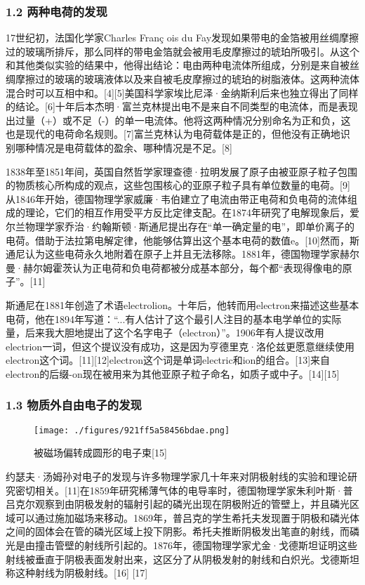 \subsubsection{1.2 两种电荷的发现}
17世纪初，法国化学家Charles Franç ois du Fay发现如果带电的金箔被用丝绸摩擦过的玻璃所排斥，那么同样的带电金箔就会被用毛皮摩擦过的琥珀所吸引。从这个和其他类似实验的结果中，他得出结论：电由两种电流体所组成，分别是来自被丝绸摩擦过的玻璃的玻璃液体以及来自被毛皮摩擦过的琥珀的树脂液体。这两种流体混合时可以互相中和。[4][5]美国科学家埃比尼泽·金纳斯利后来也独立得出了同样的结论。[6]十年后本杰明·富兰克林提出电不是来自不同类型的电流体，而是表现出过量（+）或不足（-）的单一电流体。他将这两种情况分别命名为正和负，这也是现代的电荷命名规则。[7]富兰克林认为电荷载体是正的，但他没有正确地识别哪种情况是电荷载体的盈余、哪种情况是不足。[8]

1838年至1851年间，英国自然哲学家理查德·拉明发展了原子由被亚原子粒子包围的物质核心所构成的观点，这些包围核心的亚原子粒子具有单位数量的电荷。[9]从1846年开始，德国物理学家威廉·韦伯建立了电流由带正电荷和负电荷的流体组成的理论，它们的相互作用受平方反比定律支配。在1874年研究了电解现象后，爱尔兰物理学家乔治·约翰斯顿·斯通尼提出存在“单一确定量的电”，即单价离子的电荷。借助于法拉第电解定律，他能够估算出这个基本电荷的数值e。[10]然而，斯通尼认为这些电荷永久地附着在原子上并且无法移除。1881年，德国物理学家赫尔曼·赫尔姆霍茨认为正电荷和负电荷都被分成基本部分，每个都“表现得像电的原子”。[11]

斯通尼在1881年创造了术语electrolion。十年后，他转而用electron来描述这些基本电荷，他在1894年写道：“...有人估计了这个最引人注目的基本电学单位的实际量，后来我大胆地提出了这个名字电子（electron）”。1906年有人提议改用electrion一词，但这个提议没有成功，这是因为亨德里克·洛伦兹更愿意继续使用electron这个词。[11][12]electron这个词是单词electric和ion的组合。[13]来自electron的后缀-on现在被用来为其他亚原子粒子命名，如质子或中子。[14][15]
\subsubsection{1.3 物质外自由电子的发现}
\begin{figure}[ht]
\centering
\texttt{[image: ./figures/921ff5a58456bdae.png]}
\caption{被磁场偏转成圆形的电子束[15]} \label{fig_DZ_17}
\end{figure}
约瑟夫·汤姆孙对电子的发现与许多物理学家几十年来对阴极射线的实验和理论研究密切相关。[11]在1859年研究稀薄气体的电导率时，德国物理学家朱利叶斯·普吕克尔观察到由阴极发射的辐射引起的磷光出现在阴极附近的管壁上，并且磷光区域可以通过施加磁场来移动。1869年，普吕克的学生希托夫发现置于阴极和磷光体之间的固体会在管的磷光区域上投下阴影。希托夫推断阴极发出笔直的射线，而磷光是由撞击管壁的射线所引起的。1876年，德国物理学家尤金·戈德斯坦证明这些射线被垂直于阴极表面发射出来，这区分了从阴极发射的射线和白炽光。戈德斯坦称这种射线为阴极射线。[16] [17]

